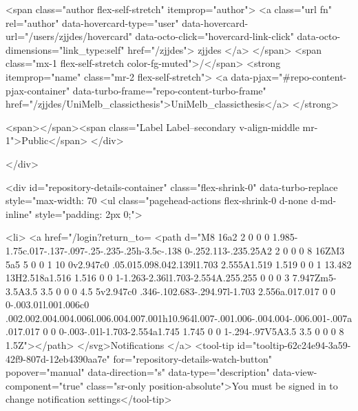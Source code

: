     <span class="author flex-self-stretch" itemprop="author">
      <a class="url fn" rel="author" data-hovercard-type="user" data-hovercard-url="/users/zjjdes/hovercard" data-octo-click="hovercard-link-click" data-octo-dimensions="link_type:self" href="/zjjdes">
        zjjdes
</a>    </span>
    <span class="mx-1 flex-self-stretch color-fg-muted">/</span>
    <strong itemprop="name" class="mr-2 flex-self-stretch">
      <a data-pjax="#repo-content-pjax-container" data-turbo-frame="repo-content-turbo-frame" href="/zjjdes/UniMelb_classicthesis">UniMelb_classicthesis</a>
    </strong>

    <span></span><span class="Label Label--secondary v-align-middle mr-1">Public</span>
  </div>


        </div>

        <div id="repository-details-container" class="flex-shrink-0" data-turbo-replace style="max-width: 70%
            <ul class="pagehead-actions flex-shrink-0 d-none d-md-inline" style="padding: 2px 0;">
    
      

  <li>
            <a href="/login?return_to=%
    <path d="M8 16a2 2 0 0 0 1.985-1.75c.017-.137-.097-.25-.235-.25h-3.5c-.138 0-.252.113-.235.25A2 2 0 0 0 8 16ZM3 5a5 5 0 0 1 10 0v2.947c0 .05.015.098.042.139l1.703 2.555A1.519 1.519 0 0 1 13.482 13H2.518a1.516 1.516 0 0 1-1.263-2.36l1.703-2.554A.255.255 0 0 0 3 7.947Zm5-3.5A3.5 3.5 0 0 0 4.5 5v2.947c0 .346-.102.683-.294.97l-1.703 2.556a.017.017 0 0 0-.003.01l.001.006c0 .002.002.004.004.006l.006.004.007.001h10.964l.007-.001.006-.004.004-.006.001-.007a.017.017 0 0 0-.003-.01l-1.703-2.554a1.745 1.745 0 0 1-.294-.97V5A3.5 3.5 0 0 0 8 1.5Z"></path>
</svg>Notifications
</a>    <tool-tip id="tooltip-62c24e94-3a59-42f9-807d-12eb4390aa7e" for="repository-details-watch-button" popover="manual" data-direction="s" data-type="description" data-view-component="true" class="sr-only position-absolute">You must be signed in to change notification settings</tool-tip>

